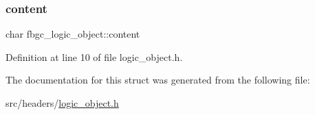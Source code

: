 \mbox{\label{structfbgc__logic__object_a7f4ab31cade57f8812f09497d03854ae}} 
\subsubsection{\texorpdfstring{content}{content}}
{\footnotesize\ttfamily char fbgc\+\_\+logic\+\_\+object\+::content}



Definition at line 10 of file logic\+\_\+object.\+h.



The documentation for this struct was generated from the following file\+:\begin{DoxyCompactItemize}
\item 
src/headers/\hyperlink{logic__object_8h}{logic\+\_\+object.\+h}\end{DoxyCompactItemize}
